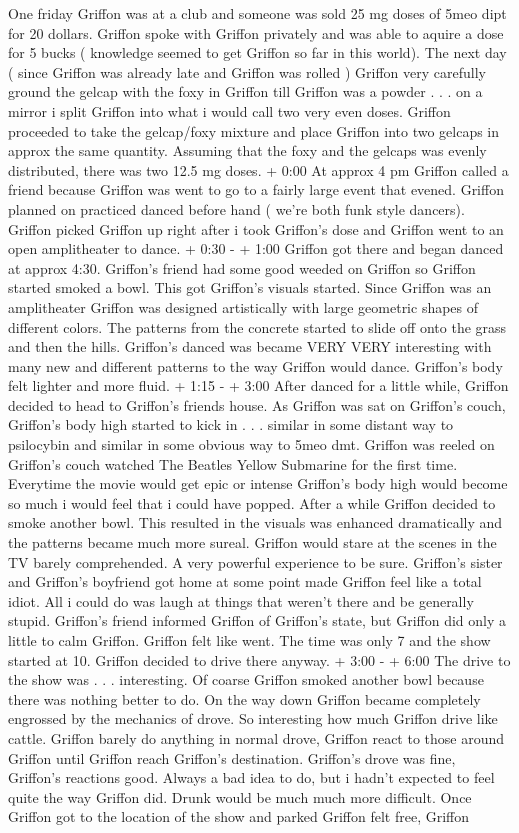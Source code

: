 \documentclass[12pt]{book}
\begin{document}
One friday Griffon was at a club and someone was sold 25 mg doses of 5meo dipt for 20 dollars. Griffon spoke with Griffon privately and was able to aquire a dose for 5 bucks ( knowledge seemed to get Griffon so far in this world). The next day ( since Griffon was already late and Griffon was rolled ) Griffon very carefully ground the gelcap with the foxy in Griffon till Griffon was a powder . . .  on a mirror i split Griffon into what i would call two very even doses. Griffon proceeded to take the gelcap/foxy mixture and place Griffon into two gelcaps in approx the same quantity. Assuming that the foxy and the gelcaps was evenly distributed, there was two 12.5 mg doses. + 0:00 At approx 4 pm Griffon called a friend because Griffon was went to go to a fairly large event that evened. Griffon planned on practiced danced before hand ( we're both funk style dancers). Griffon picked Griffon up right after i took Griffon's dose and Griffon went to an open amplitheater to dance. + 0:30 - + 1:00 Griffon got there and began danced at approx 4:30. Griffon's friend had some good weeded on Griffon so Griffon started smoked a bowl. This got Griffon's visuals started. Since Griffon was an amplitheater Griffon was designed artistically with large geometric shapes of different colors. The patterns from the concrete started to slide off onto the grass and then the hills. Griffon's danced was became VERY VERY interesting with many new and different patterns to the way Griffon would dance. Griffon's body felt lighter and more fluid. + 1:15 - + 3:00 After danced for a little while, Griffon decided to head to Griffon's friends house. As Griffon was sat on Griffon's couch, Griffon's body high started to kick in . . .  similar in some distant way to psilocybin and similar in some obvious way to 5meo dmt. Griffon was reeled on Griffon's couch watched The Beatles Yellow Submarine for the first time. Everytime the movie would get epic or intense Griffon's body high would become so much i would feel that i could have popped. After a while Griffon decided to smoke another bowl. This resulted in the visuals was enhanced dramatically and the patterns became much more sureal. Griffon would stare at the scenes in the TV barely comprehended. A very powerful experience to be sure. Griffon's sister and Griffon's boyfriend got home at some point made Griffon feel like a total idiot. All i could do was laugh at things that weren't there and be generally stupid. Griffon's friend informed Griffon of Griffon's state, but Griffon did only a little to calm Griffon. Griffon felt like went. The time was only 7 and the show started at 10. Griffon decided to drive there anyway. + 3:00 - + 6:00 The drive to the show was . . .  interesting. Of coarse Griffon smoked another bowl because there was nothing better to do. On the way down Griffon became completely engrossed by the mechanics of drove. So interesting how much Griffon drive like cattle. Griffon barely do anything in normal drove, Griffon react to those around Griffon until Griffon reach Griffon's destination. Griffon's drove was fine, Griffon's reactions good. Always a bad idea to do, but i hadn't expected to feel quite the way Griffon did. Drunk would be much much more difficult. Once Griffon got to the location of the show and parked Griffon felt free, Griffon 
\end{document}
